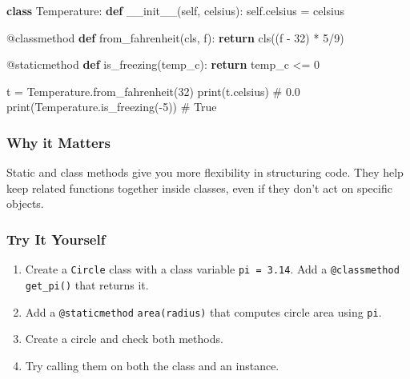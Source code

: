 \documentclass[
  letterpaper,
  DIV=11,
  numbers=noendperiod]{scrreprt}
\newenvironment{Shaded}{\begin{snugshade}}{\end{snugshade}}
\newcommand{\AttributeTok}[1]{\textcolor[rgb]{0.40,0.45,0.13}{#1}}
\newcommand{\BuiltInTok}[1]{\textcolor[rgb]{0.00,0.23,0.31}{#1}}
\newcommand{\CommentTok}[1]{\textcolor[rgb]{0.37,0.37,0.37}{#1}}
\newcommand{\ControlFlowTok}[1]{\textcolor[rgb]{0.00,0.23,0.31}{\textbf{#1}}}
\newcommand{\DecValTok}[1]{\textcolor[rgb]{0.68,0.00,0.00}{#1}}
\newcommand{\FunctionTok}[1]{\textcolor[rgb]{0.28,0.35,0.67}{#1}}
\newcommand{\KeywordTok}[1]{\textcolor[rgb]{0.00,0.23,0.31}{\textbf{#1}}}
\newcommand{\NormalTok}[1]{\textcolor[rgb]{0.00,0.23,0.31}{#1}}
\newcommand{\OperatorTok}[1]{\textcolor[rgb]{0.37,0.37,0.37}{#1}}
\newcommand{\VariableTok}[1]{\textcolor[rgb]{0.07,0.07,0.07}{#1}}
\providecommand{\tightlist}{%
  \setlength{\itemsep}{0pt}\setlength{\parskip}{0pt}}
\begin{document}
\begin{Shaded}
\begin{Highlighting}[]
\KeywordTok{class}\NormalTok{ Temperature:}
    \KeywordTok{def} \FunctionTok{\_\_init\_\_}\NormalTok{(}\VariableTok{self}\NormalTok{, celsius):}
        \VariableTok{self}\NormalTok{.celsius }\OperatorTok{=}\NormalTok{ celsius}

    \AttributeTok{@classmethod}
    \KeywordTok{def}\NormalTok{ from\_fahrenheit(cls, f):}
        \ControlFlowTok{return}\NormalTok{ cls((f }\OperatorTok{{-}} \DecValTok{32}\NormalTok{) }\OperatorTok{*} \DecValTok{5}\OperatorTok{/}\DecValTok{9}\NormalTok{)}

    \AttributeTok{@staticmethod}
    \KeywordTok{def}\NormalTok{ is\_freezing(temp\_c):}
        \ControlFlowTok{return}\NormalTok{ temp\_c }\OperatorTok{\textless{}=} \DecValTok{0}

\NormalTok{t }\OperatorTok{=}\NormalTok{ Temperature.from\_fahrenheit(}\DecValTok{32}\NormalTok{)}
\BuiltInTok{print}\NormalTok{(t.celsius)                  }\CommentTok{\# 0.0}
\BuiltInTok{print}\NormalTok{(Temperature.is\_freezing(}\OperatorTok{{-}}\DecValTok{5}\NormalTok{)) }\CommentTok{\# True}
\end{Highlighting}
\end{Shaded}

\subsubsection{Why it Matters}\label{why-it-matters-69}

Static and class methods give you more flexibility in structuring code.
They help keep related functions together inside classes, even if they
don't act on specific objects.

\subsubsection{Try It Yourself}\label{try-it-yourself-69}

\begin{enumerate}
\def\labelenumi{\arabic{enumi}.}
\tightlist
\item
  Create a \texttt{Circle} class with a class variable
  \texttt{pi\ =\ 3.14}. Add a \texttt{@classmethod} \texttt{get\_pi()}
  that returns it.
\item
  Add a \texttt{@staticmethod} \texttt{area(radius)} that computes
  circle area using \texttt{pi}.
\item
  Create a circle and check both methods.
\item
  Try calling them on both the class and an instance.
\end{enumerate}
\end{document}
